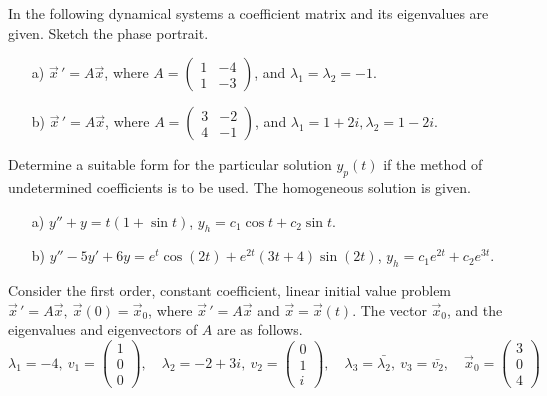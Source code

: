 \documentclass[11pt]{exam}
\begin{document}
\begin{questions}
        \vfill

        \newpage

        \question In the following dynamical systems a coefficient matrix and its eigenvalues are given. Sketch the phase portrait. 
        \begin{enumerate}
            \item[a)] $\vec x \, ' = A\vec x$, where $A=\begin{pmatrix} 1&-4\\1&-3\end{pmatrix}$, and $\lambda_1=\lambda_2 = -1$.
            \vfill
            \item[b)] $\vec x \, ' = A\vec x$, where $A=\begin{pmatrix} 3&-2\\4&-1\end{pmatrix}$, and $\lambda_1=1+2i, \lambda_2 =1-2i $. 
            \vfill
        \end{enumerate}


    \question %
    Determine a suitable form for the particular solution $y_p(t)$ if the method of undetermined coeﬃcients is to be used. The homogeneous solution is given. 
    
    \begin{enumerate}
        \item[a)] $y''+y = t(1+\sin t)$, $y_h = c_1\cos t + c_2 \sin t$. 
        \item[b)] $y'' - 5y' + 6y = e^t \cos(2t) + e^{2t} (3t + 4) \sin(2t)$, $y_h = c_1e^{2t} + c_2 e^{3t}$. 
    \end{enumerate}
    \vfill
    \newpage 

    \question Consider the first order, constant coefficient, linear initial value problem $\vec x \, ' = A\vec x, \ \vec x (0) = \vec x_0$, where $\vec x \, ' = A\vec x$ and $\vec x = \vec x(t)$. The vector $\vec x_0$, and the eigenvalues and eigenvectors of $A$ are as follows. 
$$\lambda_1 = -4, \  v_1 = \begin{pmatrix}1\\0\\0 \end{pmatrix} , \quad \lambda_2 = -2+3i, \  v_2 = \begin{pmatrix} 0\\1\\i \end{pmatrix}, \quad \lambda_3 = \bar{\lambda_2}, \ v_3 = \bar{v_2}, \quad \vec x_0 = \begin{pmatrix} 3\\0\\4\end{pmatrix}$$
\begin{parts}

\end{parts}
\end{questions}
\end{document}
